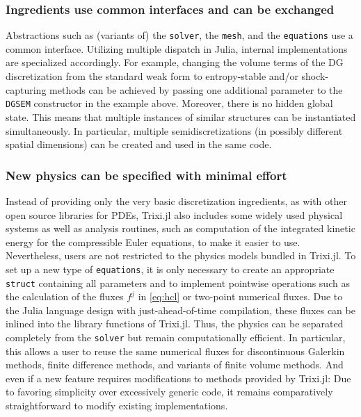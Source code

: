 \documentclass[hidelinks]{juliacon} %
\newcommand{\trixi}{Trixi.jl\xspace}
\begin{document}
\subsubsection{Ingredients use common interfaces and can be exchanged}

Abstractions such as (variants of) the \lstinline{solver}, the \lstinline{mesh},
and the \lstinline{equations} use a common interface. Utilizing multiple
dispatch in Julia, internal implementations are specialized accordingly. For
example, changing the volume terms of the DG discretization from the standard
weak form to entropy-stable and/or shock-capturing methods can be achieved by
passing one additional parameter to the \lstinline{DGSEM} constructor in the
example above. Moreover, there is no hidden global state. This means that multiple instances
of similar structures can be instantiated simultaneously. In particular, multiple
semidiscretizations (in possibly different spatial dimensions) can be created
and used in the same code.

\subsubsection{New physics can be specified with minimal effort}

Instead of providing only the very basic discretization ingredients, as with
other open source libraries for PDEs, \trixi also includes some widely used
physical systems as well as analysis routines, such as computation of the integrated kinetic energy
for the compressible Euler equations,
to make it easier to use. Nevertheless, users are not restricted
to the physics models bundled in \trixi. To set up a new type of \lstinline{equations},
it is only necessary to create an appropriate \lstinline{struct} containing all
parameters and to implement pointwise operations such as the calculation of
the fluxes $f^j$ in \eqref{eq:hcl} or two-point numerical fluxes. Due to the Julia language
design with just-ahead-of-time compilation, these fluxes can be inlined into the
library functions of \trixi. Thus, the physics can be separated completely from
the \lstinline{solver} but remain computationally efficient. In particular, this allows
a user to reuse the same numerical fluxes for discontinuous Galerkin methods, finite
difference methods, and variants of finite volume methods.
And even if a new feature requires modifications to methods provided by \trixi: Due to favoring
simplicity over excessively generic code, it remains comparatively straightforward to modify
existing implementations.
\end{document}
